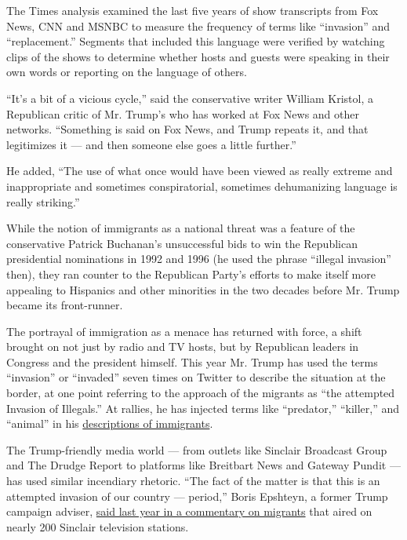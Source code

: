 The Times analysis examined the last five years of show transcripts from
Fox News, CNN and MSNBC to measure the frequency of terms like
``invasion'' and ``replacement.'' Segments that included this language
were verified by watching clips of the shows to determine whether hosts
and guests were speaking in their own words or reporting on the language
of others.

``It's a bit of a vicious cycle,'' said the conservative writer William
Kristol, a Republican critic of Mr. Trump's who has worked at Fox News
and other networks. ``Something is said on Fox News, and Trump repeats
it, and that legitimizes it --- and then someone else goes a little
further.''

He added, ``The use of what once would have been viewed as really
extreme and inappropriate and sometimes conspiratorial, sometimes
dehumanizing language is really striking.''

While the notion of immigrants as a national threat was a feature of the
conservative Patrick Buchanan's unsuccessful bids to win the Republican
presidential nominations in 1992 and 1996 (he used the phrase ``illegal
invasion'' then), they ran counter to the Republican Party's efforts to
make itself more appealing to Hispanics and other minorities in the two
decades before Mr. Trump became its front-runner.

The portrayal of immigration as a menace has returned with force, a
shift brought on not just by radio and TV hosts, but by Republican
leaders in Congress and the president himself. This year Mr. Trump has
used the terms ``invasion'' or ``invaded'' seven times on Twitter to
describe the situation at the border, at one point referring to the
approach of the migrants as ``the attempted Invasion of Illegals.'' At
rallies, he has injected terms like ``predator,'' ``killer,'' and
``animal'' in his
\href{https://www.usatoday.com/story/news/politics/elections/2019/08/08/trump-immigrants-rhetoric-criticized-el-paso-dayton-shootings/1936742001/}{descriptions
of immigrants}.

The Trump-friendly media world --- from outlets like Sinclair Broadcast
Group and The Drudge Report to platforms like Breitbart News and Gateway
Pundit --- has used similar incendiary rhetoric. ``The fact of the
matter is that this is an attempted invasion of our country ---
period,'' Boris Epshteyn, a former Trump campaign adviser,
\href{https://www.nytimes3xbfgragh.onion/2018/11/28/business/media/sinclair-broadcast-segment-trump-migrants.html}{said
last year in a commentary on migrants} that aired on nearly 200 Sinclair
television stations.

